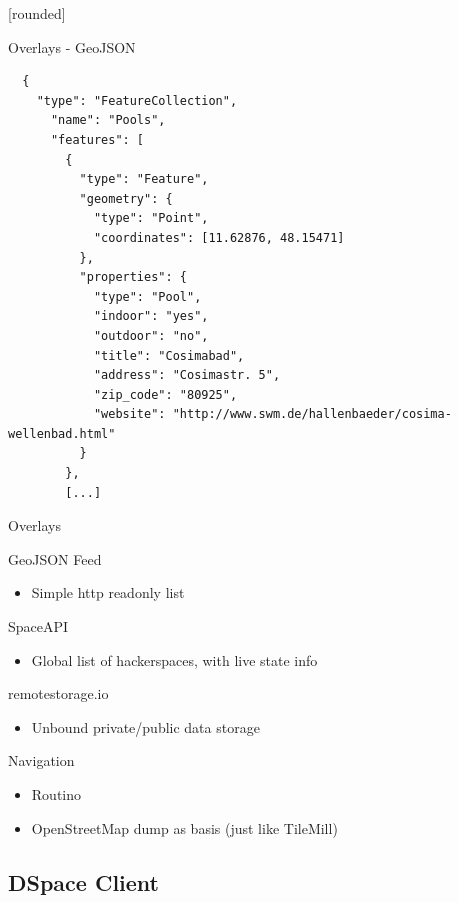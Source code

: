 \documentclass{beamer}
\newcommand\Fontvi{\fontsize{6}{7.2}\selectfont}
\begin{document}
[rounded]
\begin{frame}[fragile]{Overlays - GeoJSON}
 \Fontvi
 \begin{block}{}
  \begin{lstlisting}
  {
    "type": "FeatureCollection",
      "name": "Pools",
      "features": [
        {
          "type": "Feature",
          "geometry": {
            "type": "Point",
            "coordinates": [11.62876, 48.15471]
          },
          "properties": {
            "type": "Pool",
            "indoor": "yes",
            "outdoor": "no",
            "title": "Cosimabad",
            "address": "Cosimastr. 5",
            "zip_code": "80925",
            "website": "http://www.swm.de/hallenbaeder/cosima-wellenbad.html"
          }
        },
        [...]
  \end{lstlisting}
 \end{block}
\end{frame}


\begin{frame}{Overlays}

GeoJSON Feed
    \begin{itemize}
      \item Simple http readonly list
     \end{itemize}
SpaceAPI
      \begin{itemize}
      \item Global list of hackerspaces, with live state info
     \end{itemize}
remotestorage.io
    \begin{itemize}
      \item Unbound private/public data storage
     \end{itemize}
Navigation
      \begin{itemize}
      \item Routino
      \item OpenStreetMap dump as basis (just like TileMill)
     \end{itemize}
\end{frame}


\subsection{DSpace Client}
\end{document}
